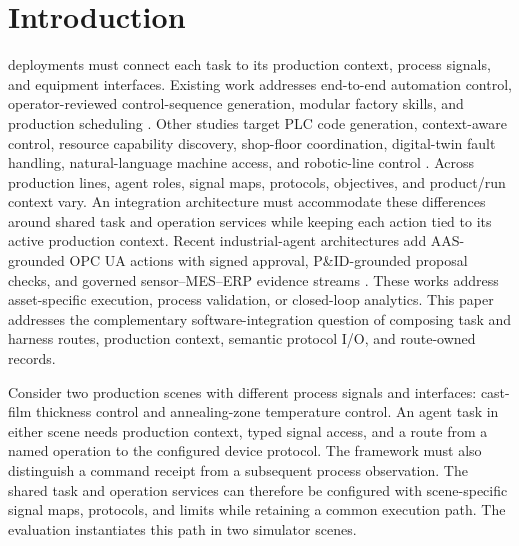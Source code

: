 \section{Introduction}
 deployments must connect each task to its
production context, process signals, and equipment interfaces. Existing work
addresses end-to-end automation control, operator-reviewed control-sequence
generation, modular factory skills, and production scheduling
\cite{xia2025control,huang2026made,koehle2026llmdriven,waseem2026pretrained}.
Other studies target PLC code generation, context-aware control, resource
capability discovery, shop-floor coordination, digital-twin fault handling,
natural-language machine access, and robotic-line control
\cite{liu2026agents4plc,wu2025instructmpc,lim2025llmenabled,zhao2026shopfloor,gill2025llmdt,hofmann2025nlc}.
Across production lines, agent roles, signal maps, protocols, objectives, and
product/run context vary. An integration architecture must accommodate these
differences around shared task and operation services while keeping each
action tied to its active production context. Recent industrial-agent
architectures add AAS-grounded OPC UA actions with signed approval,
P\&ID-grounded proposal checks, and governed sensor--MES--ERP evidence
streams \cite{graul2026aas,schall2026safe,lin2026agentic}. These works address
asset-specific execution, process validation, or closed-loop analytics. This
paper addresses the complementary software-integration question of composing
task and harness routes, production context, semantic protocol I/O, and
route-owned records.

Consider two production scenes with different process signals and interfaces:
cast-film thickness control and annealing-zone temperature control. An agent
task in either scene needs production context, typed signal access, and a
route from a named operation to the configured device protocol. The framework
must also distinguish a command receipt from a subsequent process
observation. The shared task and operation services can therefore be
configured with scene-specific signal maps, protocols, and limits while
retaining a common execution path. The evaluation instantiates this path in
two simulator scenes.

